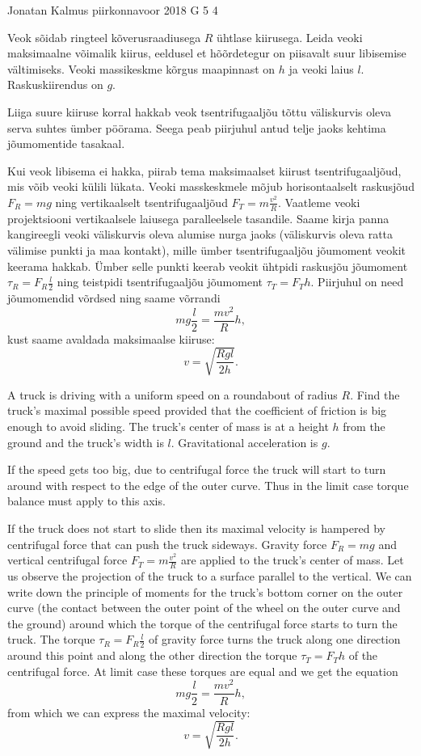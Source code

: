 {Jonatan Kalmus} %
{piirkonnavoor} %
{2018} %
{G 5} %
{4} %
{
\ifStatement
Veok sõidab ringteel kõverusraadiusega $R$ ühtlase kiirusega. Leida veoki maksimaalne võimalik kiirus, eeldusel et hõõrdetegur on piisavalt suur libisemise vältimiseks. Veoki massikeskme kõrgus maapinnast on $h$ ja veoki laius $l$. Raskuskiirendus on $g$.
\fi


\ifHint
Liiga suure kiiruse korral hakkab veok tsentrifugaaljõu tõttu väliskurvis oleva serva suhtes ümber pöörama. Seega peab piirjuhul antud telje jaoks kehtima jõumomentide tasakaal.
\fi


\ifSolution
Kui veok libisema ei hakka, piirab tema maksimaalset kiirust tsentrifugaaljõud, mis võib veoki külili lükata. Veoki masskeskmele mõjub horisontaalselt raskusjõud $F_R=mg$ ning vertikaalselt tsentrifugaaljõud $F_T=m\frac{v^2}{R}$. 
Vaatleme veoki projektsiooni vertikaalsele laiusega paralleelsele tasandile. Saame kirja panna kangireegli veoki väliskurvis oleva alumise nurga jaoks (väliskurvis oleva ratta välimise punkti ja maa kontakt), mille ümber tsentrifugaaljõu jõumoment veokit keerama hakkab. Ümber selle punkti keerab veokit ühtpidi raskusjõu jõumoment $\tau_R=F_R\frac{l}{2}$ ning teistpidi tsentrifugaaljõu jõumoment $\tau_T=F_T h$. Piirjuhul on need jõumomendid võrdsed ning saame võrrandi
$$mg\frac{l}{2}=\frac{mv^2}{R}h,$$ 
kust saame avaldada maksimaalse kiiruse:
$$v=\sqrt{\frac{Rgl}{2h}}.$$ 
\fi


\ifEngStatement
A truck is driving with a uniform speed on a roundabout of radius $R$. Find the truck’s maximal possible speed provided that the coefficient of friction is big enough to avoid sliding. The truck’s center of mass is at a height $h$ from the ground and the truck’s width is $l$. Gravitational acceleration is $g$.
\fi


\ifEngHint
If the speed gets too big, due to centrifugal force the truck will start to turn around with respect to the edge of the outer curve. Thus in the limit case torque balance must apply to this axis.
\fi


\ifEngSolution
If the truck does not start to slide then its maximal velocity is hampered by centrifugal force that can push the truck sideways. Gravity force $F_R=mg$ and vertical centrifugal force $F_T=m\frac{v^2}{R}$ are applied to the truck’s center of mass. Let us observe the projection of the truck to a surface parallel to the vertical. We can write down the principle of moments for the truck’s bottom corner on the outer curve (the contact between the outer point of the wheel on the outer curve and the ground) around which the torque of the centrifugal force starts to turn the truck. The torque $\tau_R=F_R\frac{l}{2}$ of gravity force turns the truck along one direction around this point and along the other direction the torque $\tau_T=F_T h$ of the centrifugal force. At limit case these torques are equal and we get the equation
$$mg\frac{l}{2}=\frac{mv^2}{R}h,$$ 
from which we can express the maximal velocity:
$$v=\sqrt{\frac{Rgl}{2h}}.$$
\fi
}